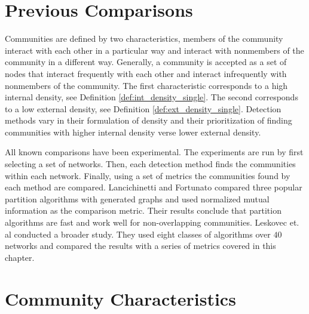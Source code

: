 \documentclass[phd,tocprelim]{cornell}
\begin{document}
\section{Previous Comparisons}







Communities are defined by two characteristics, members of the community interact with each other in a particular way and interact with nonmembers of the community in a different way.  Generally, a community is accepted as a set of nodes that interact frequently with each other and interact infrequently with nonmembers of the community.  The first characteristic corresponds to a high internal density, see Definition \ref{def:int_density_single}.  The second corresponds to a low external density, see Definition \ref{def:ext_density_single}.  Detection methods vary in their formulation of density and their prioritization of finding communities with higher internal density verse lower external density.

All known comparisons have been experimental.  The experiments are run by first selecting a set of networks.  Then, each detection method finds the communities within each network.  Finally, using a set of metrics the communities found by each method are compared.  Lancichinetti and Fortunato \cite{lanc:2009} compared three popular partition algorithms with generated graphs and used normalized mutual information as the comparison metric.  Their results conclude that partition algorithms are fast and work well for non-overlapping communities.  Leskovec et. al \cite{leskovec} conducted a broader study.  They used eight classes of algorithms over $40$ networks and compared the results with a series of metrics covered in this chapter.


\section{Community Characteristics}
\end{document}
